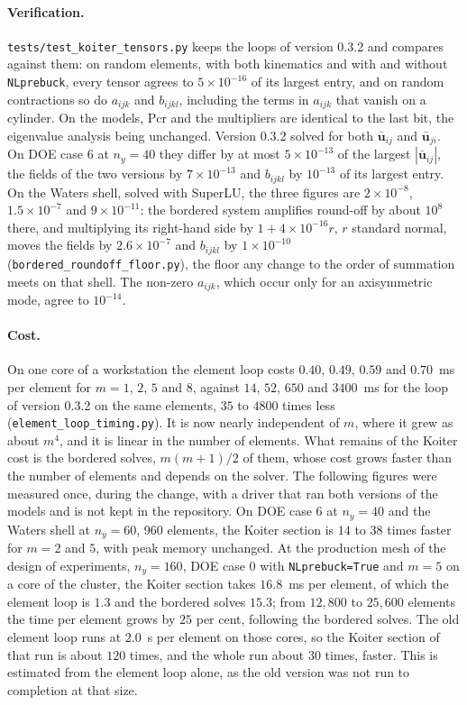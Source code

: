 \documentclass[11pt,a4paper]{article}
\begin{document}
\paragraph{Verification.}  \texttt{tests/test\_koiter\_tensors.py} keeps the
loops of version 0.3.2 and compares against them: on random elements, with
both kinematics and with and without \texttt{NLprebuck}, every tensor agrees
to $5\times10^{-16}$ of its largest entry, and on random contractions so do
$a_{ijk}$ and $b_{ijkl}$, including the terms in $a_{ijk}$ that vanish on a
cylinder.  On the models, Pcr and the multipliers are identical to the last
bit, the eigenvalue analysis being unchanged.  Version 0.3.2 solved for both
$\boldsymbol{\bar{u}}_{ij}$ and $\boldsymbol{\bar{u}}_{ji}$.  On DOE case 6
at $n_y = 40$ they differ by at most $5\times10^{-13}$ of the largest
$|\boldsymbol{\bar{u}}_{ij}|$, the fields of the two versions by
$7\times10^{-13}$ and $b_{ijkl}$ by $10^{-13}$ of its largest entry.  On the
Waters shell, solved with SuperLU, the three figures are $2\times10^{-8}$,
$1.5\times10^{-7}$ and $9\times10^{-11}$: the bordered system amplifies
round-off by about $10^8$ there, and multiplying its right-hand side by
$1 + 4\times10^{-16}r$, $r$ standard normal, moves the fields by
$2.6\times10^{-7}$ and $b_{ijkl}$ by $1\times10^{-10}$
(\texttt{bordered\_roundoff\_floor.py}), the floor any change to the order of
summation meets on that shell.  The non-zero $a_{ijk}$, which occur only for
an axisymmetric mode, agree to $10^{-14}$.

\paragraph{Cost.}  On one core of a workstation the element loop costs
$0.40$, $0.49$, $0.59$ and $0.70$~ms per element for $m = 1$, $2$, $5$ and
$8$, against $14$, $52$, $650$ and $3400$~ms for the loop of version 0.3.2 on
the same elements, $35$ to $4800$ times less
(\texttt{element\_loop\_timing.py}).  It is now nearly independent of $m$,
where it grew as about $m^4$, and it is linear in the number of elements.
What remains of the Koiter cost is the bordered solves, $m(m+1)/2$ of them,
whose cost grows faster than the number of elements and depends on the
solver.  The following figures were measured once, during the change, with a
driver that ran both versions of the models and is not kept in the
repository.  On DOE case 6 at $n_y = 40$ and the Waters shell at $n_y = 60$,
960 elements, the Koiter section is $14$ to $38$ times faster for $m = 2$ and
$5$, with peak memory unchanged.  At the production mesh of the design of
experiments, $n_y = 160$, DOE case 0 with \texttt{NLprebuck=True} and $m = 5$
on a core of the cluster, the Koiter section takes $16.8$~ms per element, of
which the element loop is $1.3$ and the bordered solves $15.3$; from $12{,}800$
to $25{,}600$ elements the time per element grows by $25$ per cent, following
the bordered solves.  The old element loop runs at $2.0$~s per element on
those cores, so the Koiter section of that run is about $120$ times, and the
whole run about $30$ times, faster.  This is estimated from the element loop
alone, as the old version was not run to completion at that size.
\end{document}
